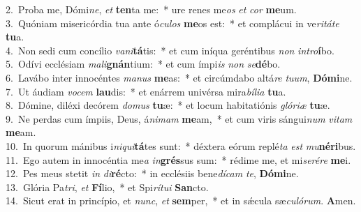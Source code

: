 {2.~}Proba me, Dómi\textit{ne}, \textit{et} \textbf{ten}ta me:~* ure renes me\textit{os} \textit{et} \textit{cor} \textbf{me}um.\\
{3.~}Quóniam misericórdia tua ante ó\textit{cu}\textit{los} \textbf{me}os est:~* et complácui in ve\textit{ri}\textit{tá}\textit{te} \textbf{tu}a.\\
{4.~}Non sedi cum concílio \textit{va}\textit{ni}\textbf{tá}tis:~* et cum iníqua geréntibus \textit{non} \textit{in}\textit{tro}\textbf{í}bo.\\
{5.~}Odívi ecclésiam \textit{ma}\textit{li}\textbf{gnán}tium:~* et cum ímpi\textit{is} \textit{non} \textit{se}\textbf{dé}bo.\\
{6.~}Lavábo inter innocéntes \textit{ma}\textit{nus} \textbf{me}as:~* et circúmdabo altá\textit{re} \textit{tu}\textit{um}, \textbf{Dó}\textbf{mi}ne.\\
{7.~}Ut áudiam \textit{vo}\textit{cem} \textbf{lau}dis:~* et enárrem univérsa mira\textit{bí}\textit{li}\textit{a} \textbf{tu}a.\\
{8.~}Dómine, diléxi decórem \textit{do}\textit{mus} \textbf{tu}æ:~* et locum habitatiónis \textit{gló}\textit{ri}\textit{æ} \textbf{tu}æ.\\
{9.~}Ne perdas cum ímpiis, Deus, á\textit{ni}\textit{mam} \textbf{me}am,~* et cum viris sángui\textit{num} \textit{vi}\textit{tam} \textbf{me}am.\\
{10.~}In quorum mánibus i\textit{ni}\textit{qui}\textbf{tá}tes sunt:~* déxtera eórum replé\textit{ta} \textit{est} \textit{mu}\textbf{né}\textbf{ri}bus.\\
{11.~}Ego autem in innocéntia me\textit{a} \textit{in}\textbf{grés}sus sum:~* rédime me, et mi\textit{se}\textit{ré}\textit{re} \textbf{me}i.\\
{12.~}Pes meus stetit \textit{in} \textit{di}\textbf{ré}cto:~* in ecclésiis bene\textit{dí}\textit{cam} \textit{te}, \textbf{Dó}\textbf{mi}ne.\\
{13.~}Glória Pa\textit{tri}, \textit{et} \textbf{Fí}lio,~* et Spi\textit{rí}\textit{tu}\textit{i} \textbf{San}cto.\\
{14.~}Sicut erat in princípio, et \textit{nunc}, \textit{et} \textbf{sem}per,~* et in sǽcula sæ\textit{cu}\textit{ló}\textit{rum}. \textbf{A}men.\\
